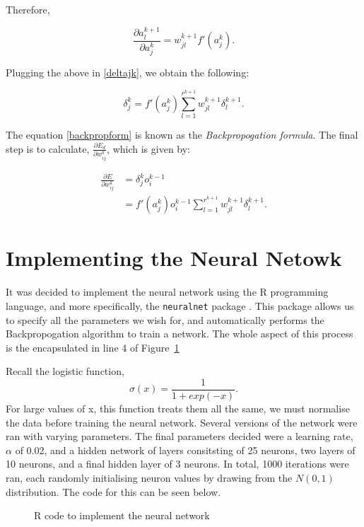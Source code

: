 Therefore,

\begin{equation}
    \frac{\partial a_l^{k+1}}{\partial a_j^k} = w_{jl}^{k+1}f'(a_j^k).
\end{equation}

Plugging the above in \ref{deltajk}, we obtain the following:

\begin{equation}
    \label{backpropform}
    \delta_j^k = f'(a_j^k)\sum^{r^{k+1}}_{l=1}w_{jl}^{k+1}\delta_l^{k+1}.
\end{equation}

The equation \ref{backpropform} is known as the \textit{Backpropogation formula}. The final step is to calculate, $\frac{\partial E_d}{\partial w_{ij}^k}$, which is given by:

\begin{align}
        \frac{\partial E}{\partial w_{ij}^k} &= \delta^k_jo_i^{k-1} \\
        &=f'(a_j^k)o^{k-1}_i \sum^{r^{k+1}}_{l=1}w_{jl}^{k+1}\delta_l^{k+1}.
\end{align}


\section{Implementing the Neural Netowk}
It was decided to implement the neural network using the R programming language, and more specifically, the \verb|neuralnet| package \cite{gunther}. This package 
allows us to specify all the parameters we wish for, and automatically performs the Backpropogation algorithm to train a network. The whole aspect of this process is the encapsulated in line 4
of Figure~\ref{nnRcode}

Recall the logistic function, $$\sigma(x) = \frac{1}{1+exp(-x)}.$$ For large values of x, this function treats them all the same, we must normalise the data before training the neural 
network. Several versions of the network were ran with varying parameters. The final parameters decided were a learning rate, $\alpha$ of 0.02, and a hidden network of layers consitsting of 
25 neurons, two layers of 10 neurons, and a final hidden layer of 3 neurons. In total, 1000 iterations were ran, each randomly initialising neuron values by drawing from the $N(0,1)$ distribution. 
The code for this can be seen below.

\begin{figure}[h] %
    
    \caption{R code to implement the neural network}
    \label{nnRcode}
\end{figure}

